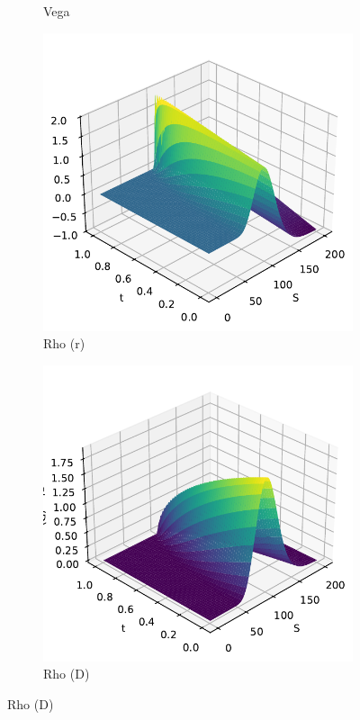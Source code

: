 \begin{figure}[H]
\begin{subfigure}[b]{0.3\linewidth}
        \caption{Vega}
    \end{subfigure}
    \begin{subfigure}[b]{0.3\linewidth}
        \includegraphics[width=\linewidth]{Imagenes/Parte1/6_Sols/Binary_Call/Binary_Call_Rho_r.pdf}
        \caption{Rho (r)}
    \end{subfigure}
    \begin{subfigure}[b]{0.3\linewidth}
        \includegraphics[width=\linewidth]{Imagenes/Parte1/6_Sols/Binary_Call/Binary_Call_Rho_D.pdf}
        \caption{Rho (D)}
    \end{subfigure}
\end{figure}


